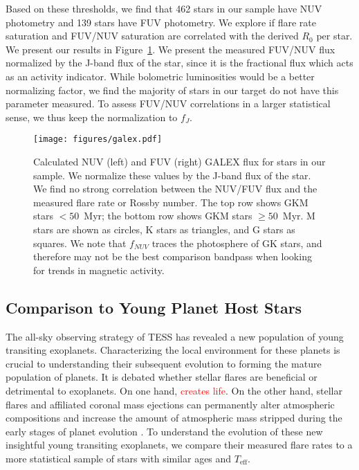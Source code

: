 \documentclass[twocolumn]{aastex631}
\begin{document}
Based on these thresholds, we find that 462 stars in our sample have NUV photometry and
139 stars have FUV photometry. We explore if flare rate saturation and FUV/NUV saturation
are correlated with the derived $R_0$ per star. We present our results in Figure~\ref{fig:galex}.
We present the measured FUV/NUV flux normalized by the J-band flux of the star, since it
is the fractional flux which acts as an activity indicator. While bolometric luminosities would
be a better normalizing factor, we find the majority of stars in our target do not have
this parameter measured. To assess FUV/NUV correlations in a larger statistical sense, we thus
keep the normalization to $f_J$.

\begin{figure}[ht!]
    \begin{centering}
        \texttt{[image: figures/galex.pdf]}
        \caption{
            Calculated NUV (left) and FUV (right) GALEX flux for stars in our
            sample. We normalize these values by the J-band flux of the star.
            We find no strong correlation between the NUV/FUV flux and the measured
            flare rate or Rossby number.
            The top row shows GKM stars $<50$~Myr; the bottom row
            shows GKM stars $\geq 50$~Myr. M stars are shown as circles, K stars as
            triangles, and G stars as squares. We note that $f_{NUV}$ traces the
            photosphere of GK stars, and therefore may not be the best comparison
            bandpass when looking for trends in magnetic activity.
        }
        \label{fig:galex}
    \end{centering}
\end{figure}


\subsection{Comparison to Young Planet Host Stars}

The all-sky observing strategy of TESS has revealed a new population of young transiting exoplanets.
Characterizing the local environment for these planets is crucial to understanding their subsequent evolution
to forming the mature population of planets. It is debated whether stellar flares are beneficial or detrimental
to exoplanets. On one hand, \textcolor{red}{creates life}. On the other hand, stellar flares and affiliated
coronal mass ejections can permanently alter atmospheric compositions \citep{chen21} and increase the amount of
atmospheric mass stripped during the early stages of planet evolution \citep{feinstein20}. To understand the
evolution of these new insightful young transiting exoplanets, we compare their measured flare rates to a more
statistical sample of stars with similar ages and $T_\textrm{eff}$.
\end{document}
